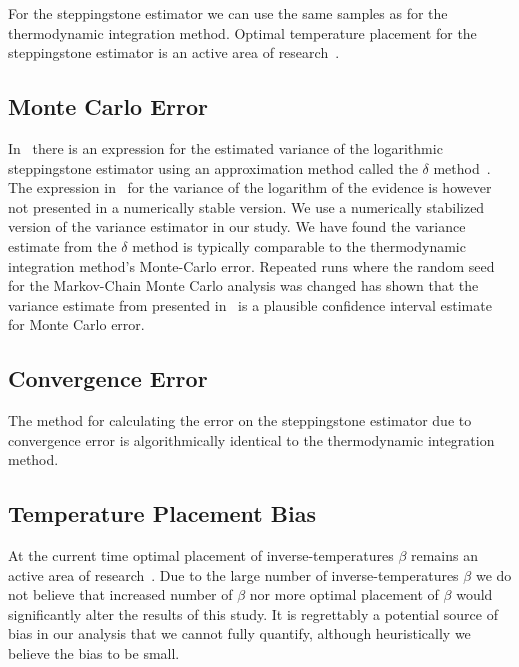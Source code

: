 For the steppingstone estimator we can use the same samples as for the thermodynamic integration method. Optimal temperature placement for the steppingstone estimator is an active area of research~\citep{annis2019thermodynamic}.

\subsection{Monte Carlo Error}
In~\cite{xie2010improving} there is an expression for the estimated variance of the logarithmic steppingstone estimator using an approximation method called the $\delta$ method~\citep{oehlert1992note}. The expression in~\cite{xie2010improving} for the variance of the logarithm of the evidence is however not presented in a numerically stable version. We use a numerically stabilized version of the variance estimator in our study. We have found the variance estimate from the $\delta$ method is typically comparable to the thermodynamic integration method's Monte-Carlo error. Repeated runs where the random seed for the Markov-Chain Monte Carlo analysis was changed has shown that the variance estimate from presented in~\cite{xie2010improving} is a plausible confidence interval estimate for Monte Carlo error.  

\subsection{Convergence Error}
The method for calculating the error on the steppingstone estimator due to convergence error is algorithmically identical to the thermodynamic integration method.

\subsection{Temperature Placement Bias}
At the current time optimal placement of inverse-temperatures $\beta$ remains an active area of research~\citep{annis2019thermodynamic}. Due to the large number of inverse-temperatures $\beta$ we do not believe that increased number of $\beta$ nor more optimal placement of $\beta$ would significantly alter the results of this study. It is regrettably a potential source of bias in our analysis that we cannot fully quantify, although heuristically we believe the bias to be small.

